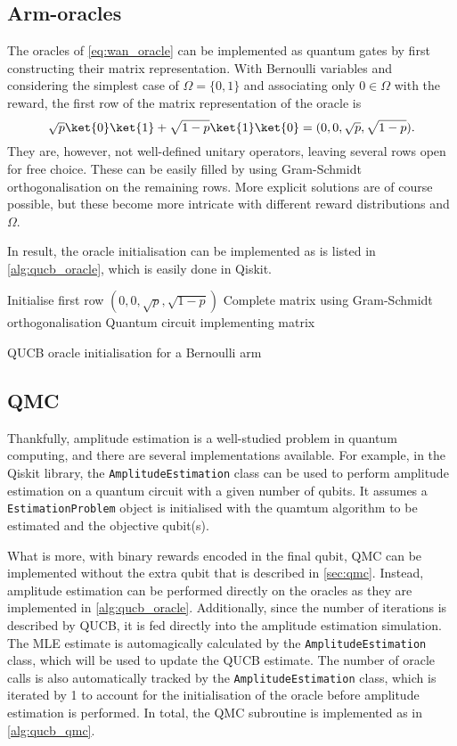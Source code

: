 \subsection{Arm-oracles}
The oracles of \cref{eq:wan_oracle} can be implemented as quantum gates by first constructing their matrix representation.
With Bernoulli variables and considering the simplest case of $\Omega = \{0, 1\}$ and associating only $0 \in \Omega$ with the reward, the first row of the matrix representation of the oracle is
\begin{equation}
    \sqrt{p} \ket{0} \ket{1} + \sqrt{1-p} \ket{1} \ket{0}
    =
    (0, 0, \sqrt{p}, \sqrt{1-p}).
\end{equation}
They are, however, not well-defined unitary operators, leaving several rows open for free choice.
These can be easily filled by using Gram-Schmidt orthogonalisation on the remaining rows.
More explicit solutions are of course possible, but these become more intricate with different reward distributions and $\Omega$.

In result, the oracle initialisation can be implemented as is listed in \cref{alg:qucb_oracle}, which is easily done in Qiskit.

\begin{algorithm}
    \SetAlgoLined
    Initialise first row $(0, 0, \sqrt{p}, \sqrt{1-p})$ \;
    Complete matrix using Gram-Schmidt orthogonalisation \;
    \Return Quantum circuit implementing matrix
    \caption{QUCB oracle initialisation for a Bernoulli arm}
    \label{alg:qucb_oracle}
\end{algorithm}

\subsection{QMC}
Thankfully, amplitude estimation is a well-studied problem in quantum computing, and there are several implementations available.
For example, in the Qiskit library, the \texttt{AmplitudeEstimation} class can be used to perform amplitude estimation on a quantum circuit with a given number of qubits.
It assumes a \texttt{EstimationProblem} object is initialised with the quamtum algorithm to be estimated and the objective qubit(s).

What is more, with binary rewards encoded in the final qubit, QMC can be implemented without the extra qubit that is described in \cref{sec:qmc}.
Instead, amplitude estimation can be performed directly on the oracles as they are implemented in \cref{alg:qucb_oracle}.
Additionally, since the number of iterations is described by QUCB, it is fed directly into the amplitude estimation simulation.
The MLE estimate is automagically calculated by the \texttt{AmplitudeEstimation} class, which will be used to update the QUCB estimate.
The number of oracle calls is also automatically tracked by the \texttt{AmplitudeEstimation} class, which is iterated by 1 to account for the initialisation of the oracle before amplitude estimation is performed.
In total, the QMC subroutine is implemented as in \cref{alg:qucb_qmc}.

